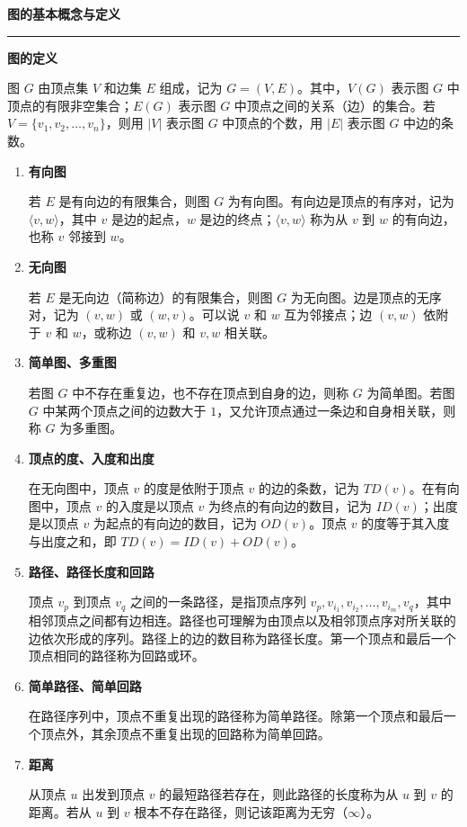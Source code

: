 \documentclass[UTF8,10pt,fontset=mac]{ctexart}
\newcommand{\defitem}[2]{\item \textbf{#1}\nopagebreak\par #2}
\begin{document}
\fontsize{9}{11.2}\selectfont

\begin{center}
  {\bfseries\Large 图的基本概念与定义}
\end{center}
\vspace{-3pt}
\hrule
\vspace{5pt}

\noindent\textbf{图的定义}\par
图 $G$ 由顶点集 $V$ 和边集 $E$ 组成，记为 $G=(V,E)$。其中，$V(G)$ 表示图 $G$ 中顶点的有限非空集合；$E(G)$ 表示图 $G$ 中顶点之间的关系（边）的集合。若 $V=\{v_1,v_2,\ldots,v_n\}$，则用 $|V|$ 表示图 $G$ 中顶点的个数，用 $|E|$ 表示图 $G$ 中边的条数。

\begin{enumerate}

\defitem{有向图}{
若 $E$ 是有向边的有限集合，则图 $G$ 为有向图。有向边是顶点的有序对，记为 $\langle v,w\rangle$，其中 $v$ 是边的起点，$w$ 是边的终点；$\langle v,w\rangle$ 称为从 $v$ 到 $w$ 的有向边，也称 $v$ 邻接到 $w$。
}

\defitem{无向图}{
若 $E$ 是无向边（简称边）的有限集合，则图 $G$ 为无向图。边是顶点的无序对，记为 $(v,w)$ 或 $(w,v)$。可以说 $v$ 和 $w$ 互为邻接点；边 $(v,w)$ 依附于 $v$ 和 $w$，或称边 $(v,w)$ 和 $v,w$ 相关联。
}

\defitem{简单图、多重图}{
若图 $G$ 中不存在重复边，也不存在顶点到自身的边，则称 $G$ 为简单图。若图 $G$ 中某两个顶点之间的边数大于 $1$，又允许顶点通过一条边和自身相关联，则称 $G$ 为多重图。
}

\defitem{顶点的度、入度和出度}{
在无向图中，顶点 $v$ 的度是依附于顶点 $v$ 的边的条数，记为 $TD(v)$。在有向图中，顶点 $v$ 的入度是以顶点 $v$ 为终点的有向边的数目，记为 $ID(v)$；出度是以顶点 $v$ 为起点的有向边的数目，记为 $OD(v)$。顶点 $v$ 的度等于其入度与出度之和，即 $TD(v)=ID(v)+OD(v)$。
}

\defitem{路径、路径长度和回路}{
顶点 $v_p$ 到顶点 $v_q$ 之间的一条路径，是指顶点序列 $v_p,v_{i_1},v_{i_2},\ldots,v_{i_m},v_q$，其中相邻顶点之间都有边相连。路径也可理解为由顶点以及相邻顶点序对所关联的边依次形成的序列。路径上的边的数目称为路径长度。第一个顶点和最后一个顶点相同的路径称为回路或环。
}

\defitem{简单路径、简单回路}{
在路径序列中，顶点不重复出现的路径称为简单路径。除第一个顶点和最后一个顶点外，其余顶点不重复出现的回路称为简单回路。
}

\defitem{距离}{
从顶点 $u$ 出发到顶点 $v$ 的最短路径若存在，则此路径的长度称为从 $u$ 到 $v$ 的距离。若从 $u$ 到 $v$ 根本不存在路径，则记该距离为无穷（$\infty$）。
}


\end{enumerate}
\end{document}
